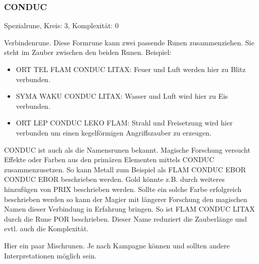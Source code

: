 \documentclass{article}
\begin{document}
\subsubsection{CONDUC}

Spezialrune, Kreis: 3, Komplexität: 0

Verbindenrune. Diese Formrune kann zwei passende Runen zusammenziehen. Sie steht im Zauber zwischen den beiden Runen.
Beispiel:

\begin{itemize}
\item ORT TEL FLAM CONDUC LITAX: Feuer und Luft werden hier zu Blitz verbunden.
\item SYMA WAKU CONDUC LITAX: Wasser und Luft wird hier zu Eis verbunden.
\item ORT LEP CONDUC LEKO FLAM: Strahl und Freisetzung wird hier verbunden um einen kegelförmigen Angriffszauber zu erzeugen.
\end{itemize}

CONDUC ist auch als die Namensrunen bekannt. Magische Forschung versucht Effekte oder Farben aus den primären
Elementen mittels CONDUC zusammenzusetzen. So kann Metall zum Beispiel als FLAM CONDUC EBOR CONDUC EBOR beschrieben
werden. Gold könnte z.B. durch weiteres hinzufügen von PRIX beschrieben werden. Sollte ein solche Farbe erfolgreich
beschrieben werden so kann der Magier mit längerer Forschung den magischen Namen dieser Verbindung in Erfahrung
bringen. So ist FLAM CONDUC LITAX durch die Rune POR beschrieben. Dieser Name reduziert die Zauberlänge und evtl. auch
die Komplexität.

Hier ein paar Mischrunen. Je nach Kampagne können und sollten andere Interpretationen möglich sein.
\end{document}
